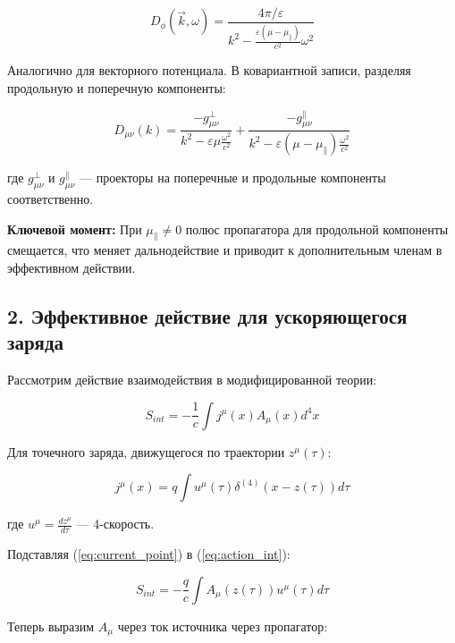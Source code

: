 \documentclass[12pt, a4paper]{article}
\begin{document}
\begin{equation}
D_{\phi}(\vec{k}, \omega) = \frac{4\pi/\varepsilon}{k^2 - \frac{\varepsilon(\mu - \mu_{\parallel})}{c^2}\omega^2}
\label{eq:propagator_phi}
\end{equation}

Аналогично для векторного потенциала. В ковариантной записи, разделяя продольную и поперечную компоненты:

\begin{equation}
D_{\mu\nu}(k) = \frac{-g_{\mu\nu}^{\perp}}{k^2 - \varepsilon\mu\frac{\omega^2}{c^2}} + \frac{-g_{\mu\nu}^{\parallel}}{k^2 - \varepsilon(\mu - \mu_{\parallel})\frac{\omega^2}{c^2}}
\label{eq:propagator_covariant}
\end{equation}

где $g_{\mu\nu}^{\perp}$ и $g_{\mu\nu}^{\parallel}$ — проекторы на поперечные и продольные компоненты соответственно.

\textbf{Ключевой момент:} При $\mu_{\parallel} \neq 0$ полюс пропагатора для продольной компоненты смещается, что меняет дальнодействие и приводит к дополнительным членам в эффективном действии.

\subsection{2. Эффективное действие для ускоряющегося заряда}

Рассмотрим действие взаимодействия в модифицированной теории:

\begin{equation}
S_{int} = -\frac{1}{c} \int j^\mu(x) A_\mu(x) d^4x
\label{eq:action_int}
\end{equation}

Для точечного заряда, движущегося по траектории $z^\mu(\tau)$:

\begin{equation}
j^\mu(x) = q \int u^\mu(\tau) \delta^{(4)}(x - z(\tau)) d\tau
\label{eq:current_point}
\end{equation}

где $u^\mu = \frac{dz^\mu}{d\tau}$ — 4-скорость.

Подставляя (\ref{eq:current_point}) в (\ref{eq:action_int}):

\begin{equation}
S_{int} = -\frac{q}{c} \int A_\mu(z(\tau)) u^\mu(\tau) d\tau
\label{eq:action_trajectory}
\end{equation}

Теперь выразим $A_\mu$ через ток источника через пропагатор:
\end{document}
